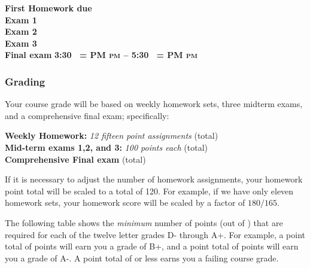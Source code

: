 \documentclass[12pt]{article}
\makeatletter
\newcounter{ex}\setcounter{ex}{0}
\newenvironment{mypar}[2]
  {\begin{list}{}%
    {\setlength\leftmargin{#1}
    \setlength\rightmargin{#2}}
    \item[]}
  {\end{list}}
\DeclareRobustCommand{\maybefakesc}[1]{%
  \ifnum\pdfstrcmp{\f@series}{\bfdefault}=\z@
    {\fontsize{\dimexpr0.8\dimexpr\f@size pt\relax}{0}\selectfont\uppercase{#1}}%
  \else
    \textsc{#1}%
  \fi
}
\newcommand\PM{\,\maybefakesc{pm}\xspace}
\makeatother
\begin{document}
\begin{mypar}{0.25in}{0.25in} 

      \textbf{First Homework due} \dotfill  \textbf{}  \\
       \textbf{Exam 1} \dotfill \textbf{}  \\
    \textbf{Exam 2} \dotfill  \textbf{} \\
    \textbf{Exam 3} \dotfill \textbf{} \\
      \textbf{Final exam} \dotfill  \textbf{ 3:30 \PM  --  5:30 \PM}
\end{mypar}



\subsubsection*{Grading}

Your course grade will be based on weekly homework sets, three midterm exams, and a comprehensive 
final exam; specifically:
\begin{mypar}{0.25in}{0.25in}
    \textbf{Weekly Homework:}  \emph{12 fifteen point assignments}   (total) \\
    \textbf{Mid-term exams 1,2, and 3:} \emph{100 points each}  (total)\\
      \textbf{Comprehensive Final exam}  (total)
\end{mypar}
If it is necessary to adjust the number of  homework assignments,  your homework point 
total will be scaled to a total of 120.  For example, if we have only eleven homework sets, 
your homework score will be scaled by a factor of \(180/165\).





The following table shows the \emph{minimum} number of points (out of \points) that
are required for each of the twelve letter grades D- through A+. For
example, a point total of \Bp\/  points will earn you a grade of B+,  and 
a point total of \Am\/ points will earn you a grade of A-. A point
total of \F\/  or less earns you a failing course grade.
 
\end{document}
